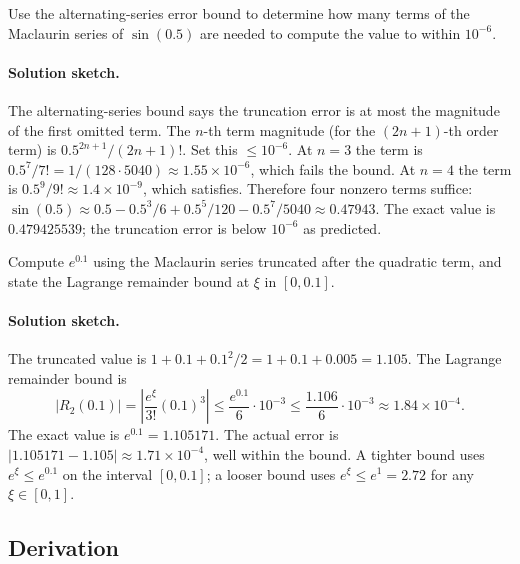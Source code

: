 \begin{exercise}
Use the alternating-series error bound to determine how many terms of
the Maclaurin series of $\sin(0.5)$ are needed to compute the value
to within $10^{-6}$.

\paragraph{Solution sketch.} The alternating-series bound says the
truncation error is at most the magnitude of the first omitted term.
The $n$-th term magnitude (for the $(2n+1)$-th order term) is
$0.5^{2n+1}/(2n+1)!$. Set this $\leq 10^{-6}$. At $n = 3$ the term
is $0.5^{7}/7! = 1/(128 \cdot 5040) \approx 1.55 \times 10^{-6}$,
which fails the bound. At $n = 4$ the term is $0.5^{9}/9! \approx
1.4 \times 10^{-9}$, which satisfies. Therefore four nonzero terms
suffice: $\sin(0.5) \approx 0.5 - 0.5^{3}/6 + 0.5^{5}/120 -
0.5^{7}/5040 \approx 0.47943$. The exact value is $0.479425539$;
the truncation error is below $10^{-6}$ as predicted.
\end{exercise}

\begin{exercise}
Compute $e^{0.1}$ using the Maclaurin series truncated after the
quadratic term, and state the Lagrange remainder bound at $\xi$ in
$[0, 0.1]$.

\paragraph{Solution sketch.} The truncated value is $1 + 0.1 +
0.1^{2}/2 = 1 + 0.1 + 0.005 = 1.105$. The Lagrange remainder bound is
\[
|R_{2}(0.1)| = \left|\frac{e^{\xi}}{3!} (0.1)^{3}\right| \leq
\frac{e^{0.1}}{6} \cdot 10^{-3} \leq \frac{1.106}{6} \cdot 10^{-3}
\approx 1.84 \times 10^{-4}.
\]
The exact value is $e^{0.1} = 1.105171$. The actual error is
$|1.105171 - 1.105| \approx 1.71 \times 10^{-4}$, well within the
bound. A tighter bound uses $e^{\xi} \leq e^{0.1}$ on the interval
$[0, 0.1]$; a looser bound uses $e^{\xi} \leq e^{1} = 2.72$ for any
$\xi \in [0, 1]$.
\end{exercise}

\subsection*{Derivation}


